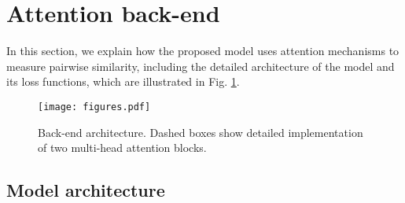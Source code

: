 \documentclass{article}
\begin{document}
\section{Attention back-end}
\vspace{-1mm}
\label{sec:pagestyle}

In this section, we explain how the proposed model uses attention mechanisms to measure pairwise similarity, including the detailed architecture of the model and its loss functions, which are illustrated in Fig. \ref{fig:back-end}.
\vspace{-1mm}

\begin{figure}[t]
  \centering
  \texttt{[image: figures.pdf]}
\caption{Back-end architecture. Dashed boxes show detailed implementation of two multi-head attention blocks.}
  \label{fig:back-end}
\end{figure}

\subsection{Model architecture}
\vspace{-1mm}
\end{document}
